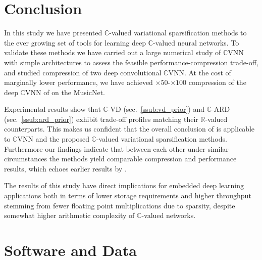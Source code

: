 \documentclass[a4paper,10pt,twocolumn]{article}
\newcommand{\real}{\mathbb{R}}
\newcommand{\cplx}{\mathbb{C}}
\begin{document}


\section{Conclusion} %
\label{sec:conclusion}

In this study we have presented $\cplx$-valued variational sparsification methods to
the ever growing set of tools for learning deep $\cplx$-valued neural networks. To
validate these methods we have carried out a large numerical study of $\cplx$VNN with
simple architectures to assess the feasible performance-compression trade-off, and
studied compression of two deep convolutional $\cplx$VNN. At the cost of marginally
lower performance, we have achieved $\times50$-$\times100$ compression of the deep
$\cplx$VNN of \citet{trabelsi_deep_2018} on the MusicNet.

Experimental results show that $\cplx$-VD (sec.~\ref{ssub:vd_prior}) and $\cplx$-ARD
(sec.~\ref{ssub:ard_prior}) exhibit trade-off profiles matching their $\real$-valued
counterparts. This makes us confident that the overall conclusion of \citet{gale_state_2019}
is applicable to $\cplx$VNN and the proposed $\cplx$-valued variational sparsification
methods.
Furthermore our findings indicate that between each other under similar circumstances
the methods yield comparable compression and performance results, which echoes earlier
results by \citet{kharitonov_variational_2018}.

The results of this study have direct implications for embedded deep learning applications
both in terms of lower storage requirements and higher throughput stemming from fewer
floating point multiplications due to sparsity, despite somewhat higher arithmetic
complexity of $\cplx$-valued networks.


\section*{Software and Data} %
\label{sec:software_and_data}
\end{document}
